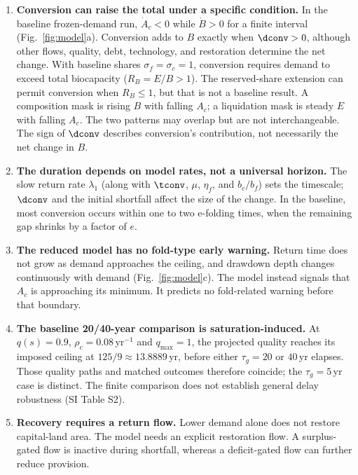 \begin{enumerate}[label=P\arabic*.,leftmargin=2.2em]
\item \textbf{Conversion can raise the total under a specific condition.} In the baseline frozen-demand run, $\dot A_c<0$ while $\dot B>0$ for a finite interval (Fig.~\ref{fig:model}a). Conversion adds to $B$ exactly when $\dconv>0$, although other flows, quality, debt, technology, and restoration determine the net change. With baseline shares $\sigma_f=\sigma_c=1$, conversion requires demand to exceed total biocapacity ($R_B=E/B>1$). The reserved-share extension can permit conversion when $R_B\le1$, but that is not a baseline result. A composition mask is rising $B$ with falling $A_c$; a liquidation mask is steady $E$ with falling $A_c$. The two patterns may overlap but are not interchangeable. The sign of $\dconv$ describes conversion's contribution, not necessarily the net change in $B$.
\item \textbf{The duration depends on model rates, not a universal horizon.} The slow return rate $\lambda_1$ (along with $\tconv$, $\mu$, $\eta_f$, and $b_c/b_f$) sets the timescale; $\dconv$ and the initial shortfall affect the size of the change. In the baseline, most conversion occurs within one to two e-folding times, when the remaining gap shrinks by a factor of $e$.
\item \textbf{The reduced model has no fold-type early warning.} Return time does not grow as demand approaches the ceiling, and drawdown depth changes continuously with demand (Fig.~\ref{fig:model}c). The model instead signals that $A_c$ is approaching its minimum. It predicts no fold-related warning before that boundary.
\item \textbf{The baseline 20/40-year comparison is saturation-induced.} At $q(s)=0.9$, $\rho_c=0.08$\,yr$^{-1}$ and $q_{\max}=1$, the projected quality reaches its imposed ceiling at $125/9\approx13.8889$\,yr, before either $\tau_g=20$ or $40$\,yr elapses. Those quality paths and matched outcomes therefore coincide; the $\tau_g=5$\,yr case is distinct. The finite comparison does not establish general delay robustness (SI Table S2).
\item \textbf{Recovery requires a return flow.} Lower demand alone does not restore capital-land area. The model needs an explicit restoration flow. A surplus-gated flow is inactive during shortfall, whereas a deficit-gated flow can further reduce provision.
\end{enumerate}
\clearpage
